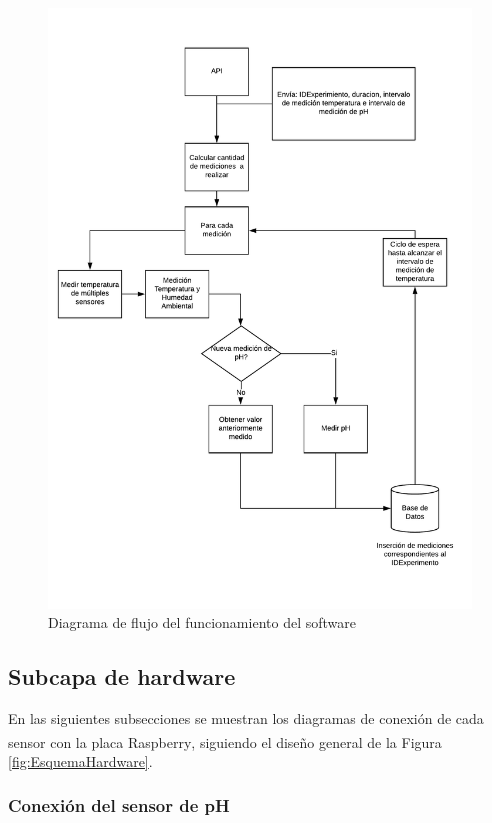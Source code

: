         \begin{figure}
        \centering
            \includegraphics[scale=0.75]{hardware/DiagramadeFlujoPython.pdf}
            \caption{Diagrama de flujo del funcionamiento del software }
            \label{FlujoPython}
        \end{figure}

    \subsection{Subcapa de hardware}
        \par En las siguientes subsecciones se muestran los diagramas de conexión de cada sensor con la placa Raspberry\textsuperscript{\textregistered}, siguiendo el diseño general de la Figura \ref{fig:EsquemaHardware}.

    \subsubsection{Conexión del sensor de pH}

